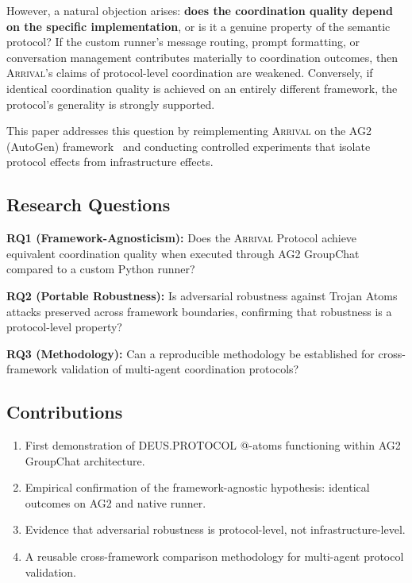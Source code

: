 \documentclass[11pt,a4paper]{article}
\newcommand{\arrival}{\textsc{Arrival}\xspace}
\begin{document}
However, a natural objection arises: \textbf{does the coordination
quality depend on the specific implementation}, or is it a genuine
property of the semantic protocol?  If the custom runner's message
routing, prompt formatting, or conversation management contributes
materially to coordination outcomes, then \arrival's claims of
protocol-level coordination are weakened.  Conversely, if identical
coordination quality is achieved on an entirely different framework,
the protocol's generality is strongly supported.

This paper addresses this question by reimplementing \arrival on the AG2
(AutoGen) framework~\cite{wu2023autogen} and conducting controlled
experiments that isolate protocol effects from infrastructure effects.

\subsection{Research Questions}

\textbf{RQ1 (Framework-Agnosticism):} Does the \arrival Protocol achieve
equivalent coordination quality when executed through AG2 GroupChat
compared to a custom Python runner?

\textbf{RQ2 (Portable Robustness):} Is adversarial robustness against
Trojan Atoms attacks preserved across framework boundaries, confirming
that robustness is a protocol-level property?

\textbf{RQ3 (Methodology):} Can a reproducible methodology be
established for cross-framework validation of multi-agent coordination
protocols?

\subsection{Contributions}

\begin{enumerate}
  \item First demonstration of DEUS.PROTOCOL @-atoms functioning within
    AG2 GroupChat architecture.
  \item Empirical confirmation of the framework-agnostic hypothesis:
    identical outcomes on AG2 and native runner.
  \item Evidence that adversarial robustness is protocol-level, not
    infrastructure-level.
  \item A reusable cross-framework comparison methodology for
    multi-agent protocol validation.
\end{enumerate}
\end{document}
